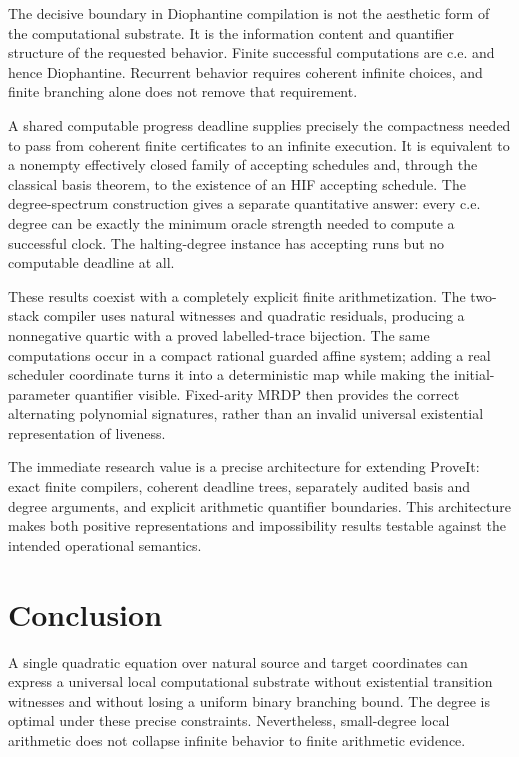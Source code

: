\documentclass[11pt,letterpaper]{article}
\theoremstyle{definition}
\theoremstyle{remark}
\newcommand{\1}{\mathbf 1}
\newcommand{\srctag}[1]{\texorpdfstring{\hspace{0.4em}{\normalfont\small\color{accent}[source #1]}}{ [source #1]}}
\begin{document}
The decisive boundary in Diophantine compilation is not the aesthetic form
of the computational substrate. It is the information content and
quantifier structure of the requested behavior. Finite successful
computations are c.e. and hence Diophantine. Recurrent behavior requires
coherent infinite choices, and finite branching alone does not remove that
requirement.

A shared computable progress deadline supplies precisely the compactness
needed to pass from coherent finite certificates to an infinite execution.
It is equivalent to a nonempty effectively closed family of accepting
schedules and, through the classical basis theorem, to the existence of an
HIF accepting schedule. The degree-spectrum construction gives a separate
quantitative answer: every c.e. degree can be exactly the minimum oracle
strength needed to compute a successful clock. The halting-degree instance
has accepting runs but no computable deadline at all.

These results coexist with a completely explicit finite arithmetization.
The two-stack compiler uses natural witnesses and quadratic residuals,
producing a nonnegative quartic with a proved labelled-trace bijection.
The same computations occur in a compact rational guarded affine system;
adding a real scheduler coordinate turns it into a deterministic map while
making the initial-parameter quantifier visible. Fixed-arity MRDP then
provides the correct alternating polynomial signatures, rather than an
invalid universal existential representation of liveness.

The immediate research value is a precise architecture for extending
ProveIt: exact finite compilers, coherent deadline trees, separately audited
basis and degree arguments, and explicit arithmetic quantifier boundaries.
This architecture makes both positive representations and impossibility
results testable against the intended operational semantics.
\section{Conclusion\srctag{03}}

A single quadratic equation over natural source and target coordinates can
express a universal local computational substrate without existential
transition witnesses and without losing a uniform binary branching bound.
The degree is optimal under these precise constraints. Nevertheless,
small-degree local arithmetic does not collapse infinite behavior to finite
arithmetic evidence.
\end{document}
